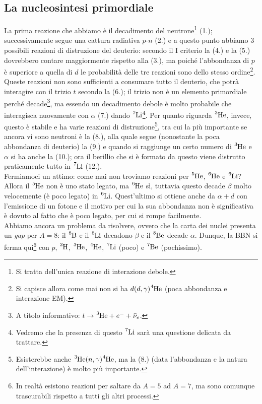 \subsection{La nucleosintesi primordiale}\label{sec-nuc-prim}
La prima reazione che abbiamo è il decadimento del neutrone\footnote{Si tratta dell'unica reazione di interazione debole.} (1.); successivamente segue una cattura radiativa $p$-$n$ (2.) e a questo punto abbiamo 3 possibili reazioni di distruzione del deuterio: secondo il I criterio la (4.) e la (5.) dovrebbero contare maggiormente rispetto alla (3.), ma poiché l'abbondanza di $p$ è superiore a quella di $d$ le probabilità delle tre reazioni sono dello stesso ordine\footnote{Si capisce allora come mai non si ha $d(d,\gamma)\ce{^4He}$ (poca abbondanza e interazione EM).}. Queste reazioni non sono sufficienti a consumare tutto il deuterio, che potrà interagire con il trizio $t$ secondo la (6.); il trizio non è un elemento primordiale perché decade\footnote{A titolo informativo: $t \to \ce{^3He}+e^-+\bar{\nu}_e$.}, ma essendo un decadimento debole è molto probabile che interagisca nuovamente con $\alpha$ (7.) dando $\ce{^7Li}$\footnote{Vedremo che la presenza di questo $\ce{^7Li}$ sarà una questione delicata da trattare.}.
Per quanto riguarda $\ce{^3He}$, invece, questo è stabile e ha varie reazioni di distruzione\footnote{Esisterebbe anche $\ce{^3He}(n,\gamma)\ce{^4He}$, ma la (8.) (data l'abbondanza e la natura dell'interazione) è molto più importante.}, tra cui la più importante se ancora vi sono neutroni è la (8.), alla quale segue (nonostante la poca abbondanza di deuterio) la (9.) e quando si raggiunge un certo numero di $\ce{^3He}$ e $\alpha$ si ha anche la (10.); ora il berillio che si è formato da questo viene distrutto praticamente tutto in $\ce{^7Li}$ (12.).\\
Fermiamoci un attimo: come mai non troviamo reazioni per $\ce{^5He}$, $\ce{^6He}$ e $\ce{^6Li}$? Allora il $\ce{^5He}$ non è uno stato legato, ma $\ce{^6He}$ sì, tuttavia questo decade $\beta$ molto velocemente (è poco legato) in $\ce{^6Li}$. Quest'ultimo si ottiene anche da $\alpha + d$ con l'emissione di un fotone e il motivo per cui la sua abbondanza non è significativa è dovuto al fatto che è poco legato, per cui si rompe facilmente.\\
Abbiamo ancora un problema da risolvere, ovvero che la carta dei nuclei presenta un \textit{gap} per $A=8$: il $\ce{^8B}$ e il $\ce{^8Li}$ decadono $\beta$ e il $\ce{^8Be}$ decade $\alpha$. Dunque, la BBN si ferma qui\footnote{In realtà esistono reazioni per saltare da $A=5$ ad $A=7$, ma sono comunque trascurabili rispetto a tutti gli altri processi.} con $p$, $\ce{^2H}$, $\ce{^3He}$, $\ce{^4He}$, $\ce{^7Li}$ (poco) e $\ce{^7Be}$ (pochissimo).

